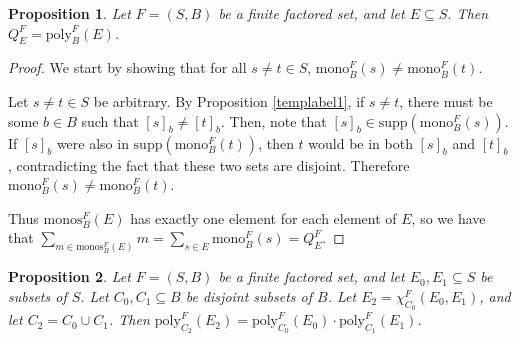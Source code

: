 \documentclass[authordate,onecolumn]{miri-tech-article}
\newtheorem{proposition}{Proposition}
\begin{document}
\begin{proposition}
Let $F=(S,B)$ be a finite factored set, and let $E\subseteq S$. Then $Q^F_E=\text{poly}^F_B(E)$.
\end{proposition}
\begin{proof}
We start by showing that for all $s\neq t\in S$, $\text{mono}^F_B(s)\neq \text{mono}^F_B(t)$. 

Let $s\neq t\in S$ be arbitrary. By Proposition \ref{templabel1}, if $s\neq t$, there must be some $b\in B$ such that $[s]_b\neq [t]_b$. Then, note that $[s]_b\in \text{supp}(\text{mono}^F_B(s))$. If $[s]_b$ were also in $\text{supp}(\text{mono}^F_B(t))$, then $t$ would be in both $[s]_b$ and $[t]_b$, contradicting the fact that these two sets are disjoint. Therefore $\text{mono}^F_B(s)\neq \text{mono}^F_B(t)$.

Thus $\text{monos}^F_B(E)$ has exactly one element for each element of $E$, so we have that $\sum_{m\in \text{monos}^F_B(E)}m=\sum_{s\in E}\text{mono}^F_B(s)=Q_E^F$.
\end{proof}
\begin{proposition}\label{factor1}
Let $F=(S,B)$ be a finite factored set, and let $E_0,E_1\subseteq S$ be subsets of $S$. Let $C_0,C_1\subseteq B$ be disjoint subsets of $B$. Let $E_2=\chi^F_{C_0}(E_0,E_1)$, and let $C_2=C_0\cup C_1$. Then $\text{poly}^F_{C_2}(E_2)=\text{poly}^F_{C_0}(E_0)\cdot \text{poly}^F_{C_1}(E_1)$.
\end{proposition}
\end{document}
